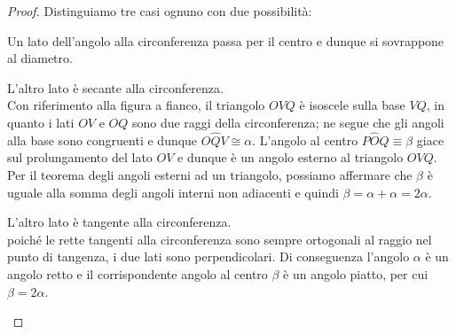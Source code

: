 \begin{proof}
Distinguiamo tre casi ognuno con due possibilità:
\begin{enumerate*}
\item Un lato dell'angolo alla circonferenza passa per il centro e 
dunque si sovrappone al diametro.
\begin{enumerate*}
\noindent\begin{minipage}{0.6\textwidth}\parindent15pt
\item L'altro lato è secante alla circonferenza.\\
Con riferimento alla figura a fianco, il triangolo $OVQ$ è isoscele 
sulla base $VQ$, in quanto i lati $OV$ e $OQ$ sono due raggi della 
circonferenza; ne segue che gli angoli alla base sono congruenti e 
dunque $O\widehat{Q}V\cong \alpha$. L'angolo al centro 
$P\widehat{O}Q\equiv \beta$ giace sul prolungamento del lato $OV$ e 
dunque è un angolo esterno al triangolo $OVQ$. Per il teorema degli 
angoli esterni ad un triangolo, possiamo affermare che $\beta$ è 
uguale alla somma degli angoli interni non adiacenti e quindi $\beta 
= \alpha + \alpha = 2\alpha$.
\end{minipage}\hfil
\noindent\hspace{-20pt}\begin{minipage}{0.4\textwidth}
  \centering
\end{minipage}
\noindent\begin{minipage}{0.6\textwidth}\parindent15pt
\item L'altro lato è tangente alla circonferenza.\\ poiché le rette 
tangenti alla circonferenza sono sempre ortogonali al raggio nel 
punto di tangenza, i due lati sono perpendicolari. Di conseguenza 
l'angolo $\alpha$ è un angolo retto e il corrispondente angolo al 
centro $\beta$ è un angolo piatto, per cui $\beta = 2\alpha$.
\end{minipage}\hfil
\noindent\hspace{-20pt}\begin{minipage}{0.4\textwidth}
  \centering
\end{minipage}
\end{enumerate*}


\end{enumerate*}
\end{proof}
